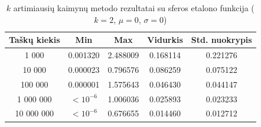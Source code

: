 \begin{table}[H]
    \centering
    \begin{tabular}{|c|c|c|c|c|}
        \hline
        \textbf{Taškų kiekis} & \textbf{Min} & \textbf{Max} & \textbf{Vidurkis} & \textbf{Std. nuokrypis} \\ \hline
        1 000        & 0.001320 & 2.488009 & 0.168114 & 0.221276 \\ \hline
        10 000       & 0.000023 & 0.796576 & 0.086259 & 0.075122 \\ \hline
        100 000      & 0.000001 & 1.575643 & 0.046430 & 0.044147 \\ \hline
        1 000 000    & $<10^{-6}$ & 1.006036 & 0.025893 & 0.023233 \\ \hline
        10 000 000   & $<10^{-6}$ & 0.676655 & 0.014460 & 0.012712 \\ \hline
    \end{tabular}
    \caption{$k$ artimiausių kaimynų metodo rezultatai su sferos etalono funkcija ($k = 2$, $\mu = 0$, $\sigma = 0$)}
\end{table}